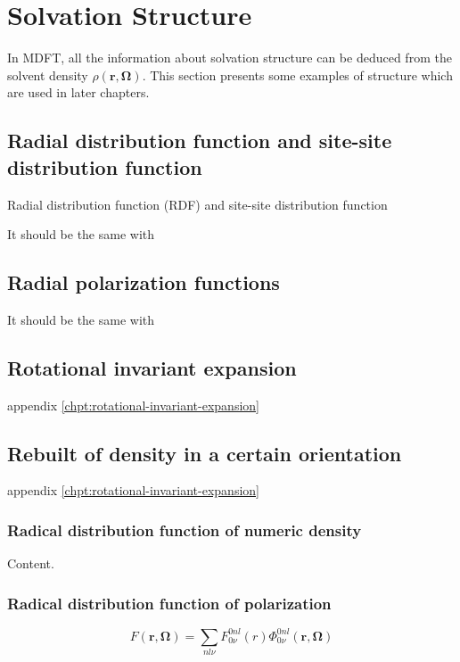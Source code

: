 
\chapter{Solvation Structure\label{chpt:solvation-structure}}

In MDFT, all the information about solvation structure can be deduced
from the solvent density $\rho(\mathbf{r},\mathbf{\Omega})$. This
section presents some examples of structure which are used in later
chapters.

\section{Radial distribution function and site-site distribution function}

Radial distribution function (\acs{RDF}) and site-site distribution
function

It should be the same with 

\section{Radial polarization functions}

It should be the same with 

\section{Rotational invariant expansion}

appendix \ref{chpt:rotational-invariant-expansion}

\section{Rebuilt of density in a certain orientation}

appendix \ref{chpt:rotational-invariant-expansion}

\subsection{Radical distribution function of numeric density}

Content.

\subsection{Radical distribution function of polarization}

\[
F(\mathbf{r},\mathbf{\Omega})=\sum_{nl\nu}F_{0\nu}^{0nl}(r)\Phi_{0\nu}^{0nl}(\mathbf{r},\mathbf{\Omega})
\]

